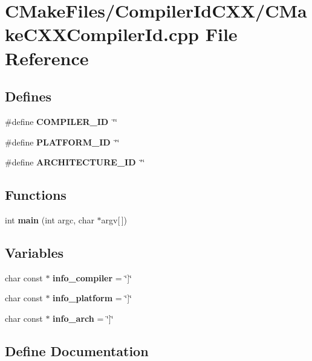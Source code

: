 \section{\-C\-Make\-Files/\-Compiler\-Id\-C\-X\-X/\-C\-Make\-C\-X\-X\-Compiler\-Id.cpp \-File \-Reference}
\label{CMakeCXXCompilerId_8cpp}
\subsection*{\-Defines}
\begin{DoxyCompactItemize}
\item 
\#define {\bf \-C\-O\-M\-P\-I\-L\-E\-R\-\_\-\-I\-D}~\char`\"{}\char`\"{}
\item 
\#define {\bf \-P\-L\-A\-T\-F\-O\-R\-M\-\_\-\-I\-D}~\char`\"{}\char`\"{}
\item 
\#define {\bf \-A\-R\-C\-H\-I\-T\-E\-C\-T\-U\-R\-E\-\_\-\-I\-D}~\char`\"{}\char`\"{}
\end{DoxyCompactItemize}
\subsection*{\-Functions}
\begin{DoxyCompactItemize}
\item 
int {\bf main} (int argc, char $\ast$argv[$\,$])
\end{DoxyCompactItemize}
\subsection*{\-Variables}
\begin{DoxyCompactItemize}
\item 
char const $\ast$ {\bf info\-\_\-compiler} = \char`\"{}]\char`\"{}
\item 
char const $\ast$ {\bf info\-\_\-platform} = \char`\"{}]\char`\"{}
\item 
char const $\ast$ {\bf info\-\_\-arch} = \char`\"{}]\char`\"{}
\end{DoxyCompactItemize}


\subsection{\-Define \-Documentation}
